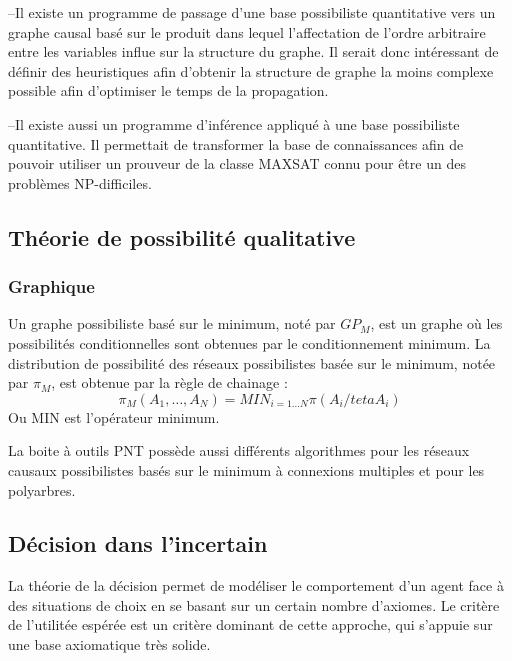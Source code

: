 –Il existe un programme de passage d’une base possibiliste quantitative vers un graphe causal basé sur le produit dans lequel l’affectation de l’ordre arbitraire entre les variables influe sur la structure du graphe. Il serait donc intéressant de définir des heuristiques afin d’obtenir la structure de graphe la moins complexe possible afin d’optimiser
le temps de la propagation.

–Il existe aussi un programme d’inférence appliqué à une base possibiliste quantitative. Il permettait de 	 transformer la base de connaissances afin de pouvoir utiliser un prouveur de la classe MAXSAT connu pour être un des problèmes NP-difficiles.\cite{hkhallafiThesis}

\subsection{Théorie de possibilité qualitative}
\subsubsection{Graphique}

Un graphe possibiliste basé sur le minimum, noté par $GP_{M}$, est un graphe où les possibilités conditionnelles sont obtenues par le conditionnement minimum. La distribution de possibilité des réseaux possibilistes basée sur le minimum, notée par $\pi_{M}$, est obtenue par la règle de chainage :
\begin{equation}
 \pi_{M} (A_1, \dots, A_N) = MIN_{i=1 \dots N} \pi (A_i/teta A_i) 
\end{equation}
Ou MIN est  l’opérateur minimum.\cite{BoBrDu2008.1}

La boite à outils PNT possède aussi différents algorithmes pour les réseaux causaux possibilistes basés sur le minimum à connexions multiples et pour les polyarbres. 

\subsection{Décision dans l’incertain}
La théorie de la décision permet de modéliser le comportement d'un agent face
à des situations de choix en se basant sur un certain nombre d'axiomes. Le critère
de l'utilitée espérée est un critère dominant de cette approche, qui s'appuie sur une
base axiomatique très solide.\cite{hkhaoulaThesis}
